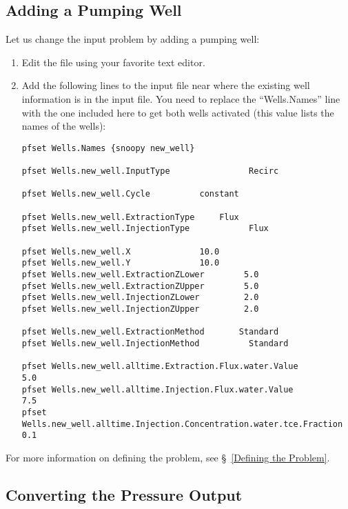 \subsection*{Adding a Pumping Well}

Let us change the input problem by adding a pumping well:
\begin{enumerate}

\item
Edit the file  using your favorite text editor.

\item 
Add the following lines to the input file near where the existing
well information is in the input file.  You need to replace
the ``Wells.Names'' line with the one included here to get both
wells activated (this value lists the names of the wells):

\begin{display}\begin{verbatim}
pfset Wells.Names {snoopy new_well}

pfset Wells.new_well.InputType                Recirc

pfset Wells.new_well.Cycle		    constant

pfset Wells.new_well.ExtractionType	    Flux
pfset Wells.new_well.InjectionType            Flux

pfset Wells.new_well.X			    10.0 
pfset Wells.new_well.Y			    10.0
pfset Wells.new_well.ExtractionZLower	     5.0
pfset Wells.new_well.ExtractionZUpper	     5.0
pfset Wells.new_well.InjectionZLower	     2.0
pfset Wells.new_well.InjectionZUpper	     2.0

pfset Wells.new_well.ExtractionMethod	    Standard
pfset Wells.new_well.InjectionMethod          Standard

pfset Wells.new_well.alltime.Extraction.Flux.water.Value        	     5.0
pfset Wells.new_well.alltime.Injection.Flux.water.Value		     7.5
pfset Wells.new_well.alltime.Injection.Concentration.water.tce.Fraction 0.1

\end{verbatim}\end{display}

\end{enumerate}
For more information on defining the problem,
see \S~\ref{Defining the Problem}.

\subsection*{Converting the Pressure Output}

